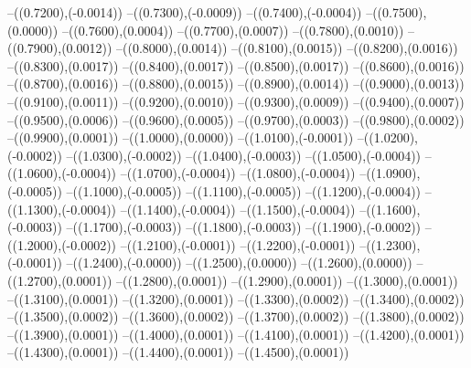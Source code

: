 {	--({\sx*(0.7200)},{\sy*(-0.0014)})
	--({\sx*(0.7300)},{\sy*(-0.0009)})
	--({\sx*(0.7400)},{\sy*(-0.0004)})
	--({\sx*(0.7500)},{\sy*(0.0000)})
	--({\sx*(0.7600)},{\sy*(0.0004)})
	--({\sx*(0.7700)},{\sy*(0.0007)})
	--({\sx*(0.7800)},{\sy*(0.0010)})
	--({\sx*(0.7900)},{\sy*(0.0012)})
	--({\sx*(0.8000)},{\sy*(0.0014)})
	--({\sx*(0.8100)},{\sy*(0.0015)})
	--({\sx*(0.8200)},{\sy*(0.0016)})
	--({\sx*(0.8300)},{\sy*(0.0017)})
	--({\sx*(0.8400)},{\sy*(0.0017)})
	--({\sx*(0.8500)},{\sy*(0.0017)})
	--({\sx*(0.8600)},{\sy*(0.0016)})
	--({\sx*(0.8700)},{\sy*(0.0016)})
	--({\sx*(0.8800)},{\sy*(0.0015)})
	--({\sx*(0.8900)},{\sy*(0.0014)})
	--({\sx*(0.9000)},{\sy*(0.0013)})
	--({\sx*(0.9100)},{\sy*(0.0011)})
	--({\sx*(0.9200)},{\sy*(0.0010)})
	--({\sx*(0.9300)},{\sy*(0.0009)})
	--({\sx*(0.9400)},{\sy*(0.0007)})
	--({\sx*(0.9500)},{\sy*(0.0006)})
	--({\sx*(0.9600)},{\sy*(0.0005)})
	--({\sx*(0.9700)},{\sy*(0.0003)})
	--({\sx*(0.9800)},{\sy*(0.0002)})
	--({\sx*(0.9900)},{\sy*(0.0001)})
	--({\sx*(1.0000)},{\sy*(0.0000)})
	--({\sx*(1.0100)},{\sy*(-0.0001)})
	--({\sx*(1.0200)},{\sy*(-0.0002)})
	--({\sx*(1.0300)},{\sy*(-0.0002)})
	--({\sx*(1.0400)},{\sy*(-0.0003)})
	--({\sx*(1.0500)},{\sy*(-0.0004)})
	--({\sx*(1.0600)},{\sy*(-0.0004)})
	--({\sx*(1.0700)},{\sy*(-0.0004)})
	--({\sx*(1.0800)},{\sy*(-0.0004)})
	--({\sx*(1.0900)},{\sy*(-0.0005)})
	--({\sx*(1.1000)},{\sy*(-0.0005)})
	--({\sx*(1.1100)},{\sy*(-0.0005)})
	--({\sx*(1.1200)},{\sy*(-0.0004)})
	--({\sx*(1.1300)},{\sy*(-0.0004)})
	--({\sx*(1.1400)},{\sy*(-0.0004)})
	--({\sx*(1.1500)},{\sy*(-0.0004)})
	--({\sx*(1.1600)},{\sy*(-0.0003)})
	--({\sx*(1.1700)},{\sy*(-0.0003)})
	--({\sx*(1.1800)},{\sy*(-0.0003)})
	--({\sx*(1.1900)},{\sy*(-0.0002)})
	--({\sx*(1.2000)},{\sy*(-0.0002)})
	--({\sx*(1.2100)},{\sy*(-0.0001)})
	--({\sx*(1.2200)},{\sy*(-0.0001)})
	--({\sx*(1.2300)},{\sy*(-0.0001)})
	--({\sx*(1.2400)},{\sy*(-0.0000)})
	--({\sx*(1.2500)},{\sy*(0.0000)})
	--({\sx*(1.2600)},{\sy*(0.0000)})
	--({\sx*(1.2700)},{\sy*(0.0001)})
	--({\sx*(1.2800)},{\sy*(0.0001)})
	--({\sx*(1.2900)},{\sy*(0.0001)})
	--({\sx*(1.3000)},{\sy*(0.0001)})
	--({\sx*(1.3100)},{\sy*(0.0001)})
	--({\sx*(1.3200)},{\sy*(0.0001)})
	--({\sx*(1.3300)},{\sy*(0.0002)})
	--({\sx*(1.3400)},{\sy*(0.0002)})
	--({\sx*(1.3500)},{\sy*(0.0002)})
	--({\sx*(1.3600)},{\sy*(0.0002)})
	--({\sx*(1.3700)},{\sy*(0.0002)})
	--({\sx*(1.3800)},{\sy*(0.0002)})
	--({\sx*(1.3900)},{\sy*(0.0001)})
	--({\sx*(1.4000)},{\sy*(0.0001)})
	--({\sx*(1.4100)},{\sy*(0.0001)})
	--({\sx*(1.4200)},{\sy*(0.0001)})
	--({\sx*(1.4300)},{\sy*(0.0001)})
	--({\sx*(1.4400)},{\sy*(0.0001)})
	--({\sx*(1.4500)},{\sy*(0.0001)})
}
